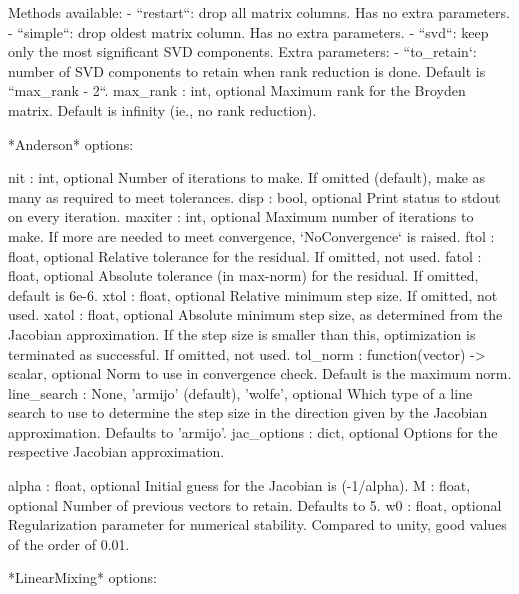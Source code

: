 \begin{DoxyVerb}
            Methods available:
                - ``restart``: drop all matrix columns. Has no
                    extra parameters.
                - ``simple``: drop oldest matrix column. Has no
                    extra parameters.
                - ``svd``: keep only the most significant SVD
                    components.
                  Extra parameters:
                      - ``to_retain`: number of SVD components to
                          retain when rank reduction is done.
                          Default is ``max_rank - 2``.
        max_rank : int, optional
            Maximum rank for the Broyden matrix.
            Default is infinity (ie., no rank reduction).

*Anderson* options:

    nit : int, optional
        Number of iterations to make. If omitted (default), make as many
        as required to meet tolerances.
    disp : bool, optional
        Print status to stdout on every iteration.
    maxiter : int, optional
        Maximum number of iterations to make. If more are needed to
        meet convergence, `NoConvergence` is raised.
    ftol : float, optional
        Relative tolerance for the residual. If omitted, not used.
    fatol : float, optional
        Absolute tolerance (in max-norm) for the residual.
        If omitted, default is 6e-6.
    xtol : float, optional
        Relative minimum step size. If omitted, not used.
    xatol : float, optional
        Absolute minimum step size, as determined from the Jacobian
        approximation. If the step size is smaller than this, optimization
        is terminated as successful. If omitted, not used.
    tol_norm : function(vector) -> scalar, optional
        Norm to use in convergence check. Default is the maximum norm.
    line_search : {None, 'armijo' (default), 'wolfe'}, optional
        Which type of a line search to use to determine the step size in
        the direction given by the Jacobian approximation. Defaults to
        'armijo'.
    jac_options : dict, optional
        Options for the respective Jacobian approximation.

        alpha : float, optional
            Initial guess for the Jacobian is (-1/alpha).
        M : float, optional
            Number of previous vectors to retain. Defaults to 5.
        w0 : float, optional
            Regularization parameter for numerical stability.
            Compared to unity, good values of the order of 0.01.

*LinearMixing* options:


\end{DoxyVerb}
